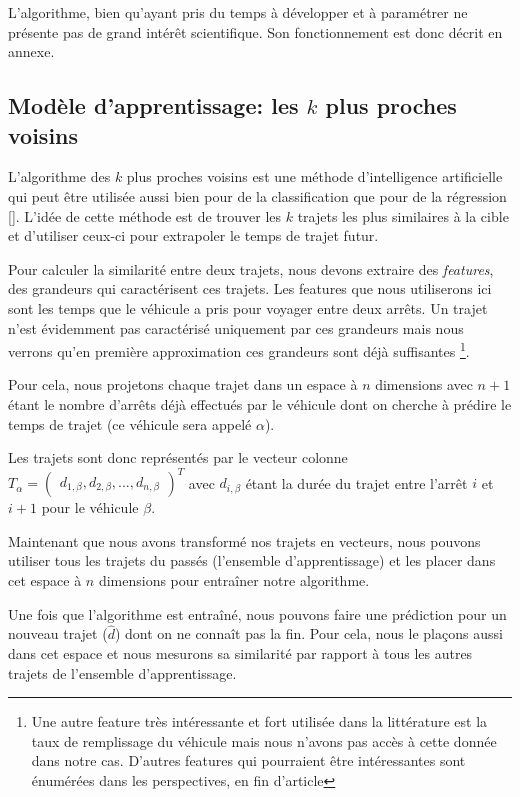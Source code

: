 \documentclass[letterpaper]{article}
\begin{document}
L'algorithme, bien qu'ayant pris du temps à développer et à paramétrer ne présente pas de grand intérêt scientifique. Son fonctionnement est donc décrit en annexe.

\subsection{Modèle d'apprentissage: les $k$ plus proches voisins}

L'algorithme des $k$ plus proches voisins
est une méthode d'intelligence artificielle qui peut être utilisée aussi bien pour de la classification que pour de la régression [\cite{trevor2009elements}].
L'idée de cette méthode est de trouver les $k$ trajets les plus similaires à la cible et d'utiliser ceux-ci pour extrapoler le temps de trajet futur.

Pour calculer la similarité entre deux trajets, nous devons extraire des \textit{features}, des grandeurs qui caractérisent ces trajets. Les features que nous utiliserons ici sont les temps que le véhicule a pris pour voyager entre deux arrêts. Un trajet n'est évidemment pas caractérisé uniquement par ces grandeurs mais nous verrons qu'en première approximation ces grandeurs sont déjà suffisantes \footnote{Une autre feature très intéressante et fort utilisée dans la littérature est la taux de remplissage du véhicule mais nous n'avons pas accès à cette donnée dans notre cas. D'autres features qui pourraient être intéressantes sont énumérées dans les perspectives, en fin d'article}.

Pour cela, nous projetons chaque trajet dans un espace à $n$ dimensions avec $n+1$ étant le nombre d'arrêts déjà effectués par le véhicule dont on cherche à prédire le temps de trajet (ce véhicule sera appelé $\alpha$).

Les trajets sont donc représentés par le vecteur colonne
$T_{\alpha} = \begin{pmatrix}d_{1,\beta}, d_{2,\beta}, ..., d_{n,\beta}\end{pmatrix}^{T}$
avec $d_{i,\beta}$ étant la durée du trajet entre l'arrêt $i$ et $i+1$ pour le véhicule $\beta$.

Maintenant que nous avons transformé nos trajets en vecteurs, nous pouvons utiliser tous les trajets du passés (l'ensemble d'apprentissage) et les placer dans cet espace à $n$ dimensions pour entraîner notre algorithme.

Une fois que l'algorithme est entraîné, nous pouvons faire une prédiction pour un nouveau trajet ($\hat{d}$) dont on ne connaît pas la fin. Pour cela, nous le plaçons aussi dans cet espace et nous mesurons sa similarité par rapport à tous les autres trajets de l'ensemble d'apprentissage.
\end{document}
